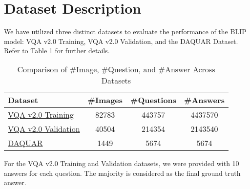 \section{Dataset Description}
\label{sec:formatting}

We have utilized three distinct datasets to evaluate the performance of the BLIP model: VQA v2.0 Training, VQA v2.0 Validation, and the DAQUAR Dataset. Refer to Table 1 for further details.

\begin{table}[h]
\centering
\begin{tabular}{@{}lccc@{}}
\toprule
Dataset & \#Images & \#Questions & \#Answers\\
\midrule
\href{https://visualqa.org/download.html}{VQA v2.0 Training} & 82783 & 443757 & 4437570\\
\href{https://visualqa.org/download.html}{VQA v2.0 Validation} & 40504 & 214354 & 2143540\\
\href{https://www.mpi-inf.mpg.de/departments/computer-vision-and-machine-learning/research/vision-and-language/visual-turing-challenge}{DAQUAR} & 1449 & 5674 & 5674\\
\bottomrule
\end{tabular}
\caption{Comparison of \#Image, \#Question, and \#Answer Across Datasets}
\label{tab:example}
\end{table}

For the VQA v2.0 Training and Validation datasets, we were provided with 10 answers for each question. The majority is considered as the final ground truth answer. 

